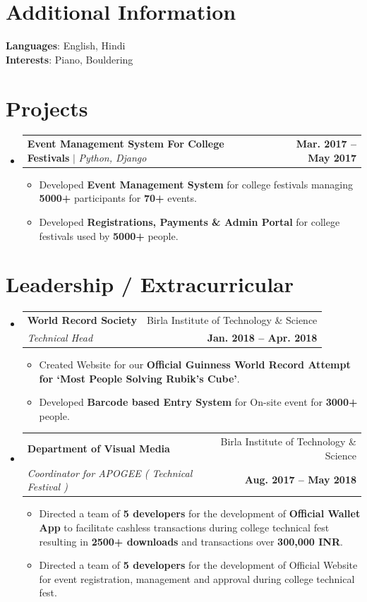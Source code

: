 \documentclass[letterpaper,11pt]{article}
\makeatletter
\newcommand{\resumeItem}[1]{
  \item\small{
    {#1 \vspace{-2pt}}
  }
}
\newcommand{\resumeSubheading}[4]{
  \vspace{-2pt}\item
    \begin{tabular*}{1.0\textwidth}[t]{l@{\extracolsep{\fill}}r}
      \textbf{#1} & {\small #2} \\
      \textit{\small#3} & \textbf{\small #4} \\
    \end{tabular*}\vspace{-7pt}
}
\newcommand{\resumeProjectHeading}[2]{
    \item
    \begin{tabular*}{1.001\textwidth}{l@{\extracolsep{\fill}}r}
      \small#1 & \textbf{\small #2}\\
    \end{tabular*}\vspace{-7pt}
}
\newcommand{\resumeSubHeadingListStart}{\begin{itemize}[leftmargin=0.0in, label={}]}
\newcommand{\resumeSubHeadingListEnd}{\end{itemize}}
\newcommand{\resumeItemListStart}{\begin{itemize}}
\newcommand{\resumeItemListEnd}{\end{itemize}\vspace{-5pt}}
\makeatother
\begin{document}
\section{Additional Information}
\textbf{Languages}{: English, Hindi }\\
\textbf{Interests}{: Piano, Bouldering }



\section{Projects}
    \vspace{-5pt}
    \resumeSubHeadingListStart
          \resumeProjectHeading
            {\textbf{Event Management System For College Festivals} $|$ \emph{Python, Django}}{Mar. 2017 -- May 2017}
            \resumeItemListStart
                \resumeItem{Developed \textbf{Event Management System} for college festivals managing \textbf{5000+} participants for \textbf{70+} events.}
                \resumeItem{Developed \textbf{Registrations, Payments \& Admin Portal} for college festivals used by \textbf{5000+} people.}
          \resumeItemListEnd
    \resumeSubHeadingListEnd

\section{Leadership / Extracurricular}
    \resumeSubHeadingListStart
        \resumeSubheading{World Record Society}{Birla Institute of Technology \& Science}{Technical Head}{Jan. 2018 -- Apr. 2018}
            \resumeItemListStart
                \resumeItem{Created Website for our \textbf{Official Guinness World Record Attempt for ‘Most People Solving Rubik’s Cube’}.}
                \resumeItem{Developed \textbf{Barcode based Entry System} for On-site event for \textbf{3000+} people.}
            \resumeItemListEnd

        \resumeSubheading{Department of Visual Media}{Birla Institute of Technology \& Science}{Coordinator for APOGEE ( Technical Festival )}{Aug. 2017 -- May 2018}
            \resumeItemListStart
                \resumeItem{Directed a team of \textbf{5 developers} for the development of \textbf{Official Wallet App} to facilitate cashless transactions during college technical fest resulting in \textbf{2500+ downloads} and transactions over \textbf{300,000 INR}.}
                \resumeItem{Directed a team of \textbf{5 developers} for the development of Official Website for event registration, management and approval during college technical fest.}
            \resumeItemListEnd
    \resumeSubHeadingListEnd
\end{document}
